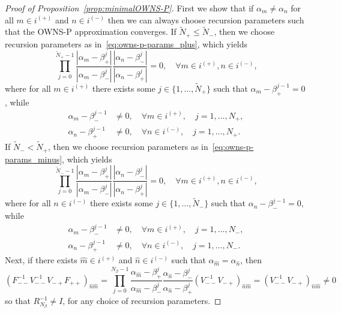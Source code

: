 \begin{proof}[Proof of Proposition~\ref{prop:minimalOWNS-P}]
    First we show that if $\alpha_m\neq\alpha_n$ for all $m\in i^{(+)}$ and $n\in i^{(-)}$ then we can always choose recursion parameters such that the OWNS-P approximation converges. If $\tilde{N}_+\leq \tilde{N}_-$, then we choose recursion parameters as in~\eqref{eq:owns-p-params_plus}, which yields
    \[
    \prod_{j=0}^{\tilde{N}_+-1}\frac{|\alpha_m-\beta_{+}^{j}|}{|\alpha_m-\beta_-^j|}
    \frac{|\alpha_n-\beta_{-}^{j}|}{|\alpha_n-\beta_+^j|}=0,\quad\forall m\in i^{(+)},n\in i^{(-)},
    \]
    where for all $m\in i^{(+)}$ there exists some $j\in \{1,\dots,\tilde{N}_+\}$ such that $\alpha_m-\beta_+^{j-1}=0$, while
    \begin{align*}
        \alpha_m-\beta_-^{j-1}&\neq0,\quad\forall m\in i^{(+)},\quad j=1,\dots,N_+,\\
        \alpha_n-\beta_+^{j-1}&\neq0,\quad\forall n\in i^{(-)},\quad j=1,\dots,N_+.
    \end{align*}
    If $\tilde{N}_- < \tilde{N}_+$, then we choose recursion parameters as in~\eqref{eq:owns-p-params_minus}, which yields
    \[
    \prod_{j=0}^{\tilde{N}_--1}\frac{|\alpha_m-\beta_{+}^{j}|}{|\alpha_m-\beta_-^j|}
    \frac{|\alpha_n-\beta_{-}^{j}|}{|\alpha_n-\beta_+^j|}=0,\quad\forall m\in i^{(+)},n\in i^{(-)},
    \]
    where for all $n\in i^{(-)}$ there exists some $j\in \{1,\dots,\tilde{N}_-\}$ such that $\alpha_n-\beta_-^{j-1}=0$, while
    \begin{align*}
        \alpha_m-\beta_-^{j-1}&\neq0,\quad\forall m\in i^{(+)},\quad j=1,\dots,N_-,\\
        \alpha_n-\beta_+^{j-1}&\neq0,\quad\forall n\in i^{(-)},\quad j=1,\dots,N_-.
    \end{align*}
    Next, if there exists $\hat{m}\in i^{(+)}$ and $\hat{n}\in i^{(-)}$ such that $\alpha_{\hat{m}}=\alpha_{\hat{n}}$, then
    \[
    (F_{--}^{-1}V_{--}^{-1}V_{-+}F_{++})_{\hat{n}\hat{m}}
    =
    \prod_{j=0}^{N_\beta-1}\frac{\alpha_{\hat{m}}-\beta_{+}^{j}}{\alpha_{\hat{m}}-\beta_-^j}\frac{\alpha_{\hat{n}}-\beta_{-}^{j}}{\alpha_{\hat{n}}-\beta_+^j}
    (V_{--}^{-1}V_{-+})_{\hat{n}\hat{m}}
    =
    (V_{--}^{-1}V_{-+})_{\hat{n}\hat{m}}
    \neq 0
    \]
    so that $R_{N_\beta}^{-1}\neq I$, for any choice of recursion parameters.
\end{proof}


